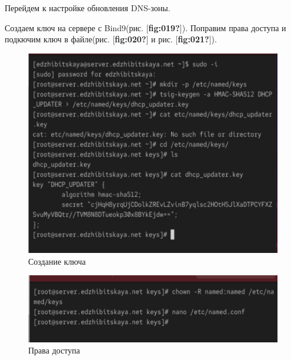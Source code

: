 \documentclass[
  english,
  russian,
  12pt,
  a4paper,
  DIV=11,
  numbers=noendperiod]{scrreprt}
\begin{document}
Перейдем к настройке обновления DNS-зоны.

Создаем ключ на сервере с Bind9(рис. {[}\textbf{fig:019?}{]}). Поправим
права доступа и подкючим ключ в файле(рис. {[}\textbf{fig:020?}{]} и
рис. {[}\textbf{fig:021?}{]}).

\begin{figure}

{\centering \includegraphics[width=0.7\linewidth,height=\textheight,keepaspectratio]{image/19.jpg}

}

\caption{Создание ключа}

\end{figure}%

\begin{figure}

{\centering \includegraphics[width=0.7\linewidth,height=\textheight,keepaspectratio]{image/20.jpg}

}

\caption{Права доступа}

\end{figure}%
\end{document}
